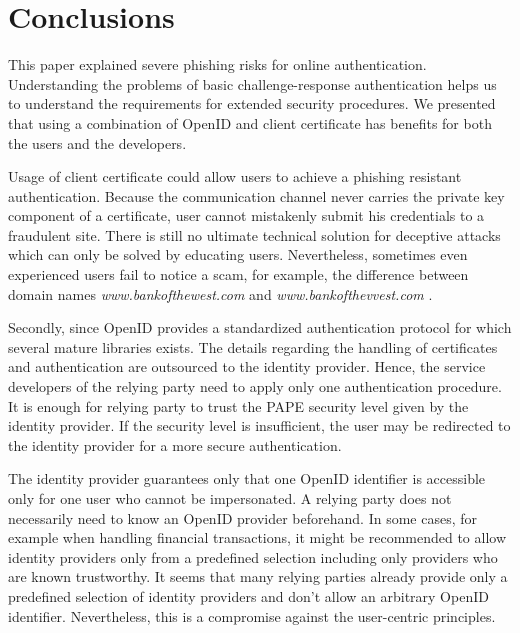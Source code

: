 \documentclass{tktltiki}
\begin{document}
\section{Conclusions}

      This paper explained severe phishing risks for online authentication. Understanding the problems of basic challenge-response authentication helps us to understand the requirements for extended security procedures. We presented that using a combination of OpenID and client certificate has benefits for both the users and the developers.
      
      Usage of client certificate could allow users to achieve a phishing resistant authentication. Because the communication channel never carries the private key component of a certificate, user cannot mistakenly submit his credentials to a fraudulent site. There is still no ultimate technical solution for deceptive attacks which can only be solved by educating users. Nevertheless, sometimes even experienced users fail to notice a scam, for example, the difference between domain names 
\emph{www.bankofthewest.com} and \emph{www.bankofthevvest.com} \cite{why_phishing_works_06}.
      
      Secondly, since OpenID provides a standardized authentication protocol for which several mature libraries exists. The details regarding the handling of certificates and authentication are outsourced to the identity provider. Hence, the service developers of the relying party need to apply only one authentication procedure. It is enough for relying party to trust the PAPE security level given by the identity provider. If the security level is insufficient, the user may be redirected to the identity provider for a more secure authentication.
      
      The identity provider guarantees only that one OpenID identifier is accessible only for one user who cannot be impersonated. A relying party does not necessarily need to know an OpenID provider beforehand. In some cases, for example when handling financial transactions, it might be recommended to allow identity providers only from a predefined selection including only providers who are known trustworthy. It seems that many relying parties already provide only a predefined selection of identity providers and don't allow an arbitrary OpenID identifier. Nevertheless, this is a compromise against the user-centric principles.
      
      
      
 


\lastpage
\end{document}
